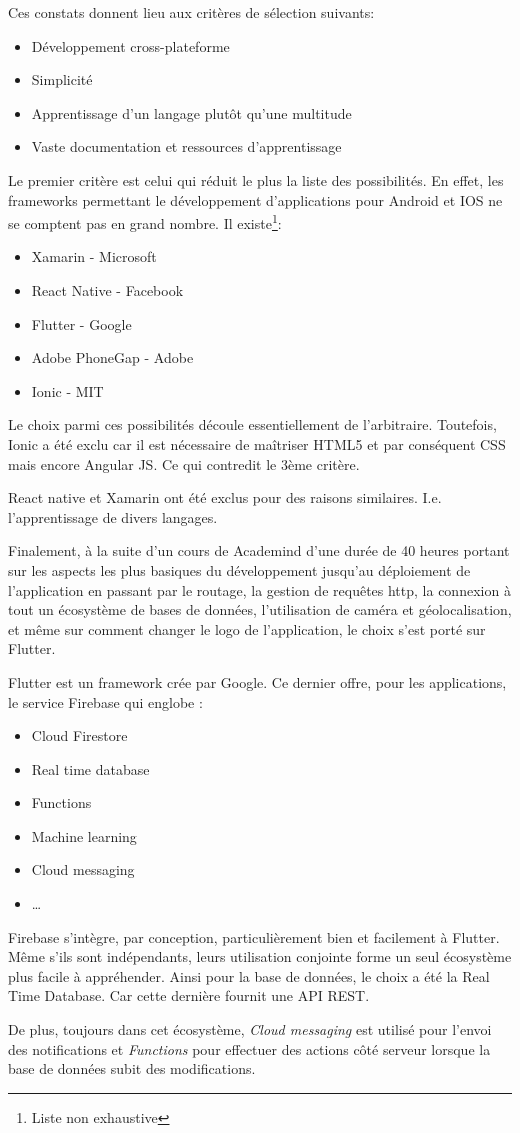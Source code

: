 Ces constats donnent lieu aux critères de sélection suivants:
\smallskip
\begin{itemize}
    \item Développement cross-plateforme
    \item Simplicité
    \item Apprentissage d'un langage plutôt qu'une multitude
    \item Vaste documentation et ressources d'apprentissage
\end{itemize}
\smallskip
Le premier critère est celui qui réduit le plus la liste des possibilités. En effet, les frameworks
permettant le développement d'applications pour Android et IOS ne se comptent pas en grand nombre. Il existe\footnote{Liste non exhaustive}:
\smallskip
\begin{itemize}
    \item Xamarin - Microsoft
    \item React Native - Facebook
    \item Flutter - Google
    \item Adobe PhoneGap - Adobe
    \item Ionic - MIT
\end{itemize}
\smallskip
Le choix parmi ces possibilités découle essentiellement de l'arbitraire. Toutefois, Ionic a été exclu car il est nécessaire de maîtriser HTML5 et par conséquent CSS mais encore Angular JS. Ce qui contredit le 3ème critère.

React native et Xamarin ont été exclus pour des raisons similaires. I.e. l'apprentissage de divers langages.

Finalement, à la suite d’un cours de Academind d'une durée de 40 heures portant sur les aspects les plus basiques du développement jusqu'au déploiement de l'application en passant par le routage, la gestion de requêtes http, la connexion à tout un écosystème de bases de données, l'utilisation de caméra et géolocalisation, et même sur comment changer le logo de l'application, le choix s'est porté sur Flutter.

Flutter est un framework crée par Google. Ce dernier offre, pour les applications, le service Firebase qui englobe :

\smallskip
\begin{itemize}
    \item Cloud Firestore
    \item Real time database
    \item Functions
    \item Machine learning
    \item Cloud messaging
    \item \dots
\end{itemize}
\smallskip
Firebase s'intègre, par conception, particulièrement bien et facilement à Flutter. Même s'ils sont
indépendants, leurs utilisation conjointe forme un seul écosystème plus facile à appréhender. Ainsi pour la
base de données, le choix a été la Real Time Database. Car cette dernière fournit une API REST.

De plus, toujours dans cet écosystème, \textit{Cloud messaging} est utilisé pour l'envoi des notifications et \textit{Functions} pour
effectuer des actions côté serveur lorsque la base de données subit des modifications.
